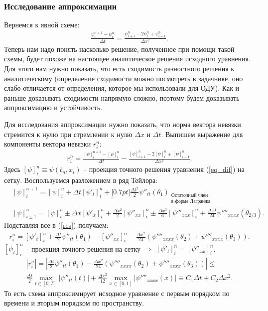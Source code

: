\documentclass[12pt]{article}
\newcommand{\dt}{\Delta t}
\newcommand{\dx}{\Delta x}
\newcommand{\ff}[2]{{\psi_{#1}^{#2}}}
\begin{document}
\subsubsection{Исследование аппроксимации}
Вернемся к явной схеме:
 \begin{align}\label{expl2}
 \frac{\ff{i}{n+1} - \ff{i}{n}}{\dt} = \frac{\ff{i+1}{n}-2\ff{i}{n}+\ff{i-1}{n}}{\dx^2}.
 \end{align}
Теперь нам надо понять насколько решение, полученное при помощи такой схемы, будет похоже на настоящее аналитическое решения исходного уравнения. Для этого нам нужно показать, что есть сходимость разностного решения к аналитическому (определение сходимости можно посмотреть в задачнике, оно слабо отличается от определения, которое мы использовали для ОДУ). Как и раньше доказывать сходимости напрямую сложно, поэтому будем доказывать аппроксимацию и устойчивость.

Для исследования аппроксимации нужно показать, что норма вектора невязки стремится к нулю при стремлении к нулю $\dx$ и $\dt$. Выпишем выражение для компоненты вектора невязки $r_i^n$:
\begin{align}\label{res}
	r_i^n = \frac{[\psi]_{i}^{n+1} - [\psi]_{i}^{n}}{\dt} - \frac{[\psi]_{i+1}^{n}-2[\psi]_{i}^{n}+[\psi]_{i-1}^{n}}{\dx^2}.
\end{align}
Здесь $[\psi]_{i}^{n} \equiv \psi(t_n,x_i)$ -- проекция точного решения уравнения (\ref{eq_dif}) на сетку. Воспользуемся разложением в ряд Тейлора:
\begin{align}
&[\psi]_{i}^{n+1} = [\psi]_{i}^{n} + \dt [\psi'_t]_{i}^{n} + \underbracket[0.7pt]{\frac{\dt^2}{2}\psi''_{tt}(\theta_1)}_{\substack{\text{Остаточный член} \\ \text{в форме Лагранжа}}} \\
&[\psi]_{i \pm 1}^{n} = [\psi]_{i}^{n} \pm \dx [\psi'_x]_{i}^{n} + \frac{\dx^2}{2}[\psi''_{xx}]_{i}^{n} \pm \frac{\dx^3}{6}[\psi'''_{xxx}]_i^n + \frac{\dx^4}{24}\psi''''_{xxxx}(\theta_{2/3}).
\end{align} 
Подставляя все в (\ref{res}) получаем:
\begin{align}\label{res}
r_i^n = [\psi'_t]_{i}^{n}+\frac{\dt}{2}\psi''_{tt}(\theta_1) - [\psi''_{xx}]_{i}^{n} - \frac{\dx^2}{24}(\psi''''_{xxxx}(\theta_{2})+\psi''''_{xxxx}(\theta_{3})).
\end{align}
$[\psi_t]_{i}^{n}$ -- проекция точного решения на сетку $\Rightarrow$ $[\psi'_t]_{i}^{n}=[\psi''_{xx}]_{i}^{n}$.
\begin{align}\label{res}
|r_i^n| =\left| \frac{\dt}{2}\psi''_{tt}(\theta_1) - \frac{\dx^2}{24}(\psi''''_{xxxx}(\theta_{2})+\psi''''_{xxxx}(\theta_{3}))\right| \le \\
\frac{\dt}{2} \max_{t\in [0,T]} |\psi''_{tt}(t)| + \frac{\dx^2}{12}\max_{x\in [0,1]}|\psi''''_{xxxx}(x)|\equiv C_1 \dt + C_2 \dx^2.
\end{align}
То есть схема аппроксимирует исходное уравнение с первым порядком по времени и вторым порядком по пространству.\\
\end{document}
